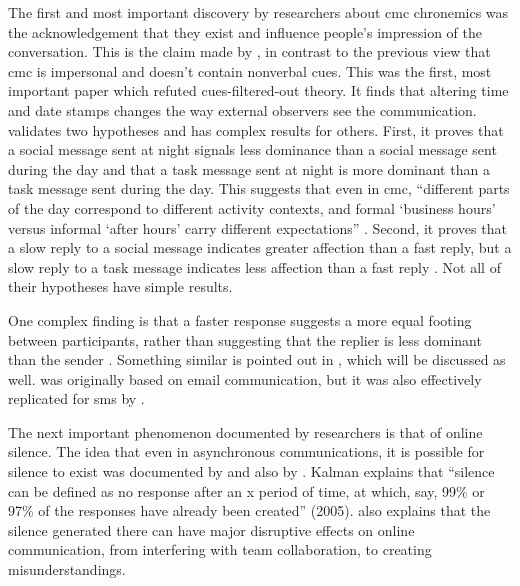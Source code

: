 \documentclass[
  stu]{apa7}
\begin{document}
The first and most important discovery by researchers about cmc
chronemics was the acknowledgement that they exist and influence
people's impression of the conversation. This is the claim made by
\textcite{walther95}, in contrast to the previous view that cmc is
impersonal and doesn't contain nonverbal cues. This was the first, most
important paper which refuted cues-filtered-out theory. It finds that
altering time and date stamps changes the way external observers see the
communication. \textcite{walther95} validates two hypotheses and has
complex results for others. First, it proves that a social message sent
at night signals less dominance than a social message sent during the
day and that a task message sent at night is more dominant than a task
message sent during the day. This suggests that even in cmc, ``different
parts of the day correspond to different activity contexts, and formal
`business hours' versus informal `after hours' carry different
expectations'' \autocite[ 361]{walther95}. Second, it proves that a slow
reply to a social message indicates greater affection than a fast reply,
but a slow reply to a task message indicates less affection than a fast
reply \autocite[ 370]{walther95}. Not all of their hypotheses have
simple results.

One complex finding is that a faster response suggests a more equal
footing between participants, rather than suggesting that the replier is
less dominant than the sender \autocite[ 371]{walther95}. Something
similar is pointed out in \textcite{kalman13}, which will be discussed
as well. \textcite{walther95} was originally based on email
communication, but it was also effectively replicated for sms by
\textcite{doring09}.

The next important phenomenon documented by researchers is that of
online silence. The idea that even in asynchronous communications, it is
possible for silence to exist was documented by \textcite{ravid} and
also by \textcite{kalman05}. Kalman explains that ``silence can be
defined as no response after an x period of time, at which, say, 99\% or
97\% of the responses have already been created'' (2005).
\textcite{kalman05} also explains that the silence generated there can
have major disruptive effects on online communication, from interfering
with team collaboration, to creating misunderstandings.
\end{document}
